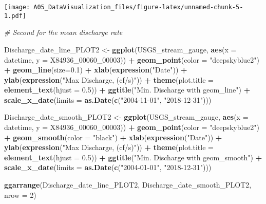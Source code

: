 \documentclass[]{article}
\newenvironment{Shaded}{\begin{snugshade}}{\end{snugshade}}
\newcommand{\KeywordTok}[1]{\textcolor[rgb]{0.13,0.29,0.53}{\textbf{#1}}}
\newcommand{\DataTypeTok}[1]{\textcolor[rgb]{0.13,0.29,0.53}{#1}}
\newcommand{\DecValTok}[1]{\textcolor[rgb]{0.00,0.00,0.81}{#1}}
\newcommand{\FloatTok}[1]{\textcolor[rgb]{0.00,0.00,0.81}{#1}}
\newcommand{\StringTok}[1]{\textcolor[rgb]{0.31,0.60,0.02}{#1}}
\newcommand{\CommentTok}[1]{\textcolor[rgb]{0.56,0.35,0.01}{\textit{#1}}}
\newcommand{\OperatorTok}[1]{\textcolor[rgb]{0.81,0.36,0.00}{\textbf{#1}}}
\newcommand{\NormalTok}[1]{#1}
\begin{document}
\texttt{[image: A05\_DataVisualization\_files/figure-latex/unnamed-chunk-5-1.pdf]}

\begin{Shaded}
\begin{Highlighting}[]
\CommentTok{# Second for the mean discharge rate}

\NormalTok{Discharge_date_line_PLOT2 <-}\StringTok{ }\KeywordTok{ggplot}\NormalTok{(USGS_stream_gauge, }\KeywordTok{aes}\NormalTok{(}\DataTypeTok{x =}\NormalTok{ datetime, }\DataTypeTok{y =}\NormalTok{ X84936_00060_}\DecValTok{00003}\NormalTok{)) }\OperatorTok{+}
\StringTok{  }\KeywordTok{geom_point}\NormalTok{(}\DataTypeTok{color =} \StringTok{"deepskyblue2"}\NormalTok{) }\OperatorTok{+}
\StringTok{  }\KeywordTok{geom_line}\NormalTok{(}\DataTypeTok{size=}\FloatTok{0.1}\NormalTok{) }\OperatorTok{+}
\StringTok{  }\KeywordTok{xlab}\NormalTok{(}\KeywordTok{expression}\NormalTok{(}\StringTok{"Date"}\NormalTok{)) }\OperatorTok{+}
\StringTok{  }\KeywordTok{ylab}\NormalTok{(}\KeywordTok{expression}\NormalTok{(}\StringTok{"Max Discharge, (cf/s)"}\NormalTok{)) }\OperatorTok{+}
\StringTok{  }\KeywordTok{theme}\NormalTok{(}\DataTypeTok{plot.title =} \KeywordTok{element_text}\NormalTok{(}\DataTypeTok{hjust =} \FloatTok{0.5}\NormalTok{)) }\OperatorTok{+}
\StringTok{  }\KeywordTok{ggtitle}\NormalTok{(}\StringTok{"Min. Discharge with geom_line"}\NormalTok{) }\OperatorTok{+}
\StringTok{  }\KeywordTok{scale_x_date}\NormalTok{(}\DataTypeTok{limits =} \KeywordTok{as.Date}\NormalTok{(}\KeywordTok{c}\NormalTok{(}\StringTok{"2004-11-01"}\NormalTok{, }\StringTok{"2018-12-31"}\NormalTok{)))}

\NormalTok{Discharge_date_smooth_PLOT2 <-}\StringTok{ }\KeywordTok{ggplot}\NormalTok{(USGS_stream_gauge, }\KeywordTok{aes}\NormalTok{(}\DataTypeTok{x =}\NormalTok{ datetime, }\DataTypeTok{y =}\NormalTok{ X84936_00060_}\DecValTok{00003}\NormalTok{)) }\OperatorTok{+}
\StringTok{  }\KeywordTok{geom_point}\NormalTok{(}\DataTypeTok{color =} \StringTok{"deepskyblue2"}\NormalTok{) }\OperatorTok{+}
\StringTok{  }\KeywordTok{geom_smooth}\NormalTok{(}\DataTypeTok{color =} \StringTok{"black"}\NormalTok{) }\OperatorTok{+}
\StringTok{  }\KeywordTok{xlab}\NormalTok{(}\KeywordTok{expression}\NormalTok{(}\StringTok{"Date"}\NormalTok{)) }\OperatorTok{+}
\StringTok{  }\KeywordTok{ylab}\NormalTok{(}\KeywordTok{expression}\NormalTok{(}\StringTok{"Max Discharge, (cf/s)"}\NormalTok{)) }\OperatorTok{+}
\StringTok{  }\KeywordTok{theme}\NormalTok{(}\DataTypeTok{plot.title =} \KeywordTok{element_text}\NormalTok{(}\DataTypeTok{hjust =} \FloatTok{0.5}\NormalTok{)) }\OperatorTok{+}
\StringTok{  }\KeywordTok{ggtitle}\NormalTok{(}\StringTok{"Min. Discharge with geom_smooth"}\NormalTok{) }\OperatorTok{+}
\StringTok{  }\KeywordTok{scale_x_date}\NormalTok{(}\DataTypeTok{limits =} \KeywordTok{as.Date}\NormalTok{(}\KeywordTok{c}\NormalTok{(}\StringTok{"2004-01-01"}\NormalTok{, }\StringTok{"2018-12-31"}\NormalTok{)))}

\KeywordTok{ggarrange}\NormalTok{(Discharge_date_line_PLOT2, Discharge_date_smooth_PLOT2, }\DataTypeTok{nrow =} \DecValTok{2}\NormalTok{)}
\end{Highlighting}
\end{Shaded}
\end{document}
